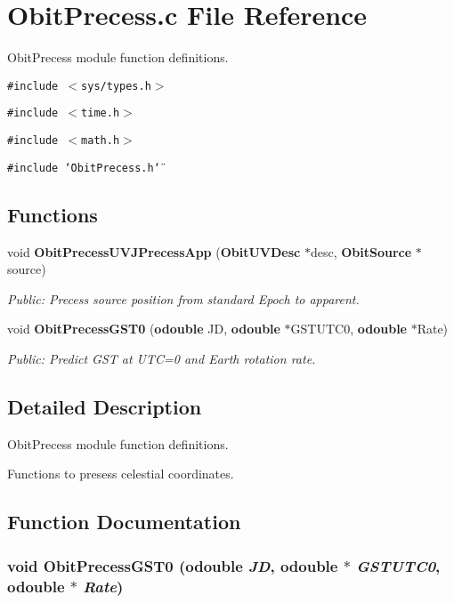 \section{Obit\-Precess.c File Reference}
\label{ObitPrecess_8c}
Obit\-Precess module function definitions. 

{\tt \#include $<$sys/types.h$>$}\par
{\tt \#include $<$time.h$>$}\par
{\tt \#include $<$math.h$>$}\par
{\tt \#include \char`\"{}Obit\-Precess.h\char`\"{}}\par
\subsection*{Functions}
\begin{CompactItemize}
\item 
void {\bf Obit\-Precess\-UVJPrecess\-App} ({\bf Obit\-UVDesc} $\ast$desc, {\bf Obit\-Source} $\ast$source)
\begin{CompactList}\small\item\em Public: Precess source position from standard Epoch to apparent. \item\end{CompactList}\item 
void {\bf Obit\-Precess\-GST0} ({\bf odouble} JD, {\bf odouble} $\ast$GSTUTC0, {\bf odouble} $\ast$Rate)
\begin{CompactList}\small\item\em Public: Predict GST at UTC=0 and Earth rotation rate. \item\end{CompactList}\end{CompactItemize}


\subsection{Detailed Description}
Obit\-Precess module function definitions. 

Functions to presess celestial coordinates.

\subsection{Function Documentation}
\subsubsection{\setlength{\rightskip}{0pt plus 5cm}void Obit\-Precess\-GST0 ({\bf odouble} {\em JD}, {\bf odouble} $\ast$ {\em GSTUTC0}, {\bf odouble} $\ast$ {\em Rate})}\label{ObitPrecess_8c_a7}


